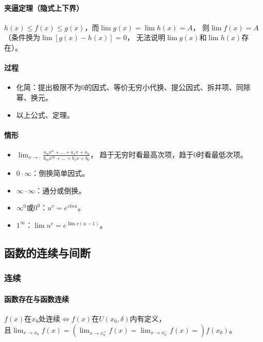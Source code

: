 \documentclass[
12pt, %
a4paper, 
oneside, %
headinclude,footinclude, %
]{scrartcl}
\begin{document}
\paragraph{夹逼定理（隐式上下界）}
$ h(x) \leq f(x) \leq g(x) $，而$ \lim g(x) = \lim h(x) = A $，
则$ \lim f(x) = A $（条件换为$ \lim [g(x) - h(x)] = 0 $，
无法说明$ \lim g(x) $和$ \lim h(x) $存在）。
\paragraph{过程}
\begin{itemize}
\item 化简：提出极限不为$ 0 $的因式、等价无穷小代换、提公因式、拆并项、同除幂、换元。
\item 以上公式、定理。
\end{itemize}
\paragraph{情形}
\begin{itemize}
\item $ \lim_{x \to \cdot} \frac{a_n x^n + \dots + a_1x + a_0}{b_m x^m + \dots + b_1x + b_0} $，
趋于无穷时看最高次项，趋于0时看最低次项。
\item $ 0 \cdot \infty $：倒换简单因式。
\item $ \infty \cdot \infty $：通分或倒换。
\item $ \infty^0 $或$ 0^0 $：$ u^{v} = e^{vlnu} $。
\item $ 1^\infty $：$ \lim u^{v} = e^{\lim v(u - 1)} $。
\end{itemize}
\subsection{函数的连续与间断}
\subsubsection{连续}
\paragraph{函数存在与函数连续}
$ f(x) $在$ x_0 $处连续$ \Leftrightarrow $$ f(x) $在$ U(x_0, \delta) $内有定义，\\
且$ \lim_{x \to x_0}f(x) = (\lim_{x \to x_0^+}f(x) = \lim_{x \to x_0^-}f(x) =) f(x_0) $。
\end{document}
